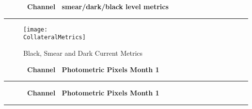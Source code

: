 
\cleardoublepage
\begin{figure*}[h!]
  \centering
  \hfill
  {\Huge {\bf \quarter\ Channel \channel\ smear/dark/black level metrics}}
  \hfill
\end{figure*}
\hrule
\begin{figure*}[h!]
  \centering
  \texttt{[image: \\CollateralMetrics]}
  \caption{Black, Smear and Dark Current Metrics}
\end{figure*}


%
%

\cleardoublepage
\begin{figure*}[h!]
  \centering
  \hfill
  {\Huge {\bf \quarter\ Channel \channel\ Photometric Pixels Month 1}}
  \hfill
\end{figure*}
\hrule
\begin{figure*}[h!]
  \centering
\end{figure*}


\cleardoublepage
\begin{figure*}[h!]
  \centering
  \hfill
  {\Huge {\bf \quarter\ Channel \channel\ Photometric Pixels Month 1}}
  \hfill
\end{figure*}
\hrule

